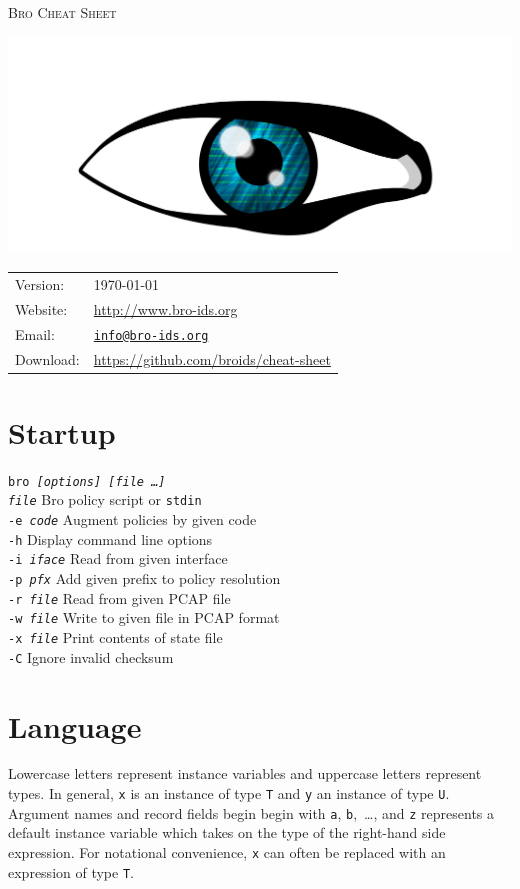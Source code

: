\documentclass[10pt,landscape]{article}
\begin{document}
\begin{multicols*}{3}

{\Huge\scshape Bro Cheat Sheet}

\hfill\includegraphics[width=.4\linewidth]{bro-logo-small}
\vspace{-38pt}

{\scriptsize
{}
\begin{tabular}{l l}
Version: & \today\\
Website: & \url{http://www.bro-ids.org}\\
Email: & \texttt{\href{mailto:info@bro-ids.org}{info@bro-ids.org}}\\
Download: & \url{https://github.com/broids/cheat-sheet}
\end{tabular}
}

\section*{Startup}

\texttt{bro \textit{[options] [file \dots]}}\\
\texttt{\textit{file}} \dotfill Bro policy script or \texttt{stdin}\\
\texttt{-e \textit{code}} \dotfill Augment policies by given code\\
\texttt{-h} \dotfill Display command line options\\
\texttt{-i \textit{iface}} \dotfill Read from given interface\\
\texttt{-p \textit{pfx}} \dotfill Add given prefix to policy resolution\\
\texttt{-r \textit{file}} \dotfill Read from given PCAP file\\
\texttt{-w \textit{file}} \dotfill Write to given file in PCAP format\\
\texttt{-x \textit{file}} \dotfill Print contents of state file\\
\texttt{-C} \dotfill Ignore invalid checksum

\section*{Language}

Lowercase letters represent instance variables and uppercase letters represent
types. In general, \texttt{x} is an instance of type \texttt{T} and \texttt{y}
an instance of type \texttt{U}. Argument names and record fields begin begin
with \texttt{a}, \texttt{b},~\ldots, and \texttt{z} represents a default
instance variable which takes on the type of the right-hand side expression.
For notational convenience, \texttt{x} can often be replaced with an expression
of type \texttt{T}.


\end{multicols*}
\end{document}
